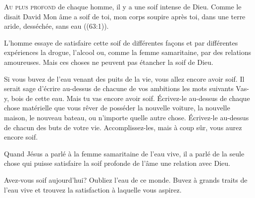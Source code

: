 \dvrule







\lettrine{A}{u plus profond} de chaque homme,
 il y a une soif intense de Dieu.
 Comme le disait David\frcolon{} 
 \Og Mon âme a soif de toi, mon corps soupire après toi,
 dans une terre aride, desséchée, sans eau \Fg{}
 ((63:1)). 

L'homme essaye de satisfaire cette soif de différentes fa\c{c}ons
 et par différentes expériences \ocadr la drogue, l'alcool ou,
 comme la femme samaritaine, par des relations amoureuses.
 Mais ces choses ne peuvent pas étancher la soif de Dieu.


Si vous buvez de l'eau venant des puits de la vie,
 vous allez encore avoir soif.
 Il serait sage d'écrire au-dessus
 de chacune de vos ambitions les mots suivants\frcolon{}
 \Og Vas-y, bois de cette eau. Mais tu vas encore avoir soif. \Fg{}
 Écrivez-le  au-dessus de chaque chose matérielle
 que vous rêver de posséder \ocadr la nouvelle voiture, la nouvelle maison,
 le nouveau bateau, ou n'importe quelle autre chose.
 Écrivez-le au-dessus de chacun des buts de votre vie.
 Accomplissez-les, mais à coup sûr, vous aurez encore soif.

Quand Jésus a parlé à la femme samaritaine de l'eau vive,
 il a parlé de la seule chose qui puisse satisfaire
 la soif profonde de l'âme \ocadr une relation avec Dieu.

Avez-vous soif aujourd'hui? Oubliez l'eau de ce monde.
 Buvez à grands traits de l'eau vive et trouvez la satisfaction
 à laquelle vous aspirez.

\dvrule

